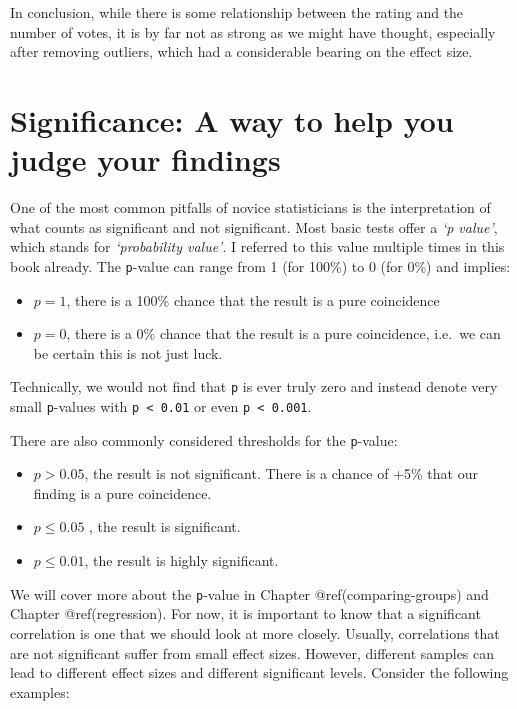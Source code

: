 \documentclass[
  letterpaper,
]{krantz}
\begin{document}
In conclusion, while there is some relationship between the rating and
the number of votes, it is by far not as strong as we might have
thought, especially after removing outliers, which had a considerable
bearing on the effect size.

\section{Significance: A way to help you judge your
findings}\label{sec-significance}

One of the most common pitfalls of novice statisticians is the
interpretation of what counts as significant and not significant. Most
basic tests offer a \emph{`p value'}, which stands for
\emph{`probability value'}. I referred to this value multiple times in
this book already. The \texttt{p}-value can range from 1 (for 100\%) to
0 (for 0\%) and implies:

\begin{itemize}
\item
  \(p = 1\), there is a 100\% chance that the result is a pure
  coincidence
\item
  \(p = 0\), there is a 0\% chance that the result is a pure
  coincidence, i.e.~we can be certain this is not just luck.
\end{itemize}

Technically, we would not find that \texttt{p} is ever truly zero and
instead denote very small \texttt{p}-values with
\texttt{p\ \textless{}\ 0.01} or even \texttt{p\ \textless{}\ 0.001}.

There are also commonly considered thresholds for the \texttt{p}-value:

\begin{itemize}
\item
  \(p > 0.05\), the result is not significant. There is a chance of +5\%
  that our finding is a pure coincidence.
\item
  \(p \leq 0.05\) , the result is significant.
\item
  \(p \leq 0.01\), the result is highly significant.
\end{itemize}

We will cover more about the \texttt{p}-value in Chapter
@ref(comparing-groups) and Chapter @ref(regression). For now, it is
important to know that a significant correlation is one that we should
look at more closely. Usually, correlations that are not significant
suffer from small effect sizes. However, different samples can lead to
different effect sizes and different significant levels. Consider the
following examples:
\end{document}
